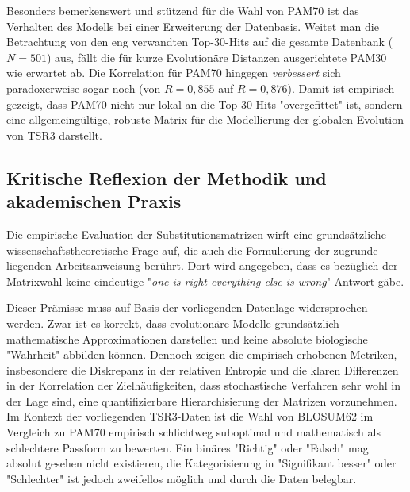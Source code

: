 \documentclass[11pt, a4paper]{article}
\begin{document}
Besonders bemerkenswert und stützend für die Wahl von PAM70 ist das Verhalten des Modells bei einer Erweiterung der Datenbasis. Weitet man die Betrachtung von den eng verwandten Top-30-Hits auf die gesamte Datenbank ($N=501$) aus, fällt die für kurze Evolutionäre Distanzen ausgerichtete PAM30 wie erwartet ab. Die Korrelation für PAM70 hingegen \textit{verbessert} sich paradoxerweise sogar noch (von $R=0{,}855$ auf $R=0{,}876$). Damit ist empirisch gezeigt, dass PAM70 nicht nur lokal an die Top-30-Hits "overgefittet" ist, sondern eine allgemeingültige, robuste Matrix für die Modellierung der globalen Evolution von TSR3 darstellt.


\subsection{Kritische Reflexion der Methodik und akademischen Praxis}
Die empirische Evaluation der Substitutionsmatrizen wirft eine grundsätzliche wissenschaftstheoretische Frage auf, die auch die Formulierung der zugrunde liegenden Arbeitsanweisung berührt. Dort wird angegeben, dass es bezüglich der Matrixwahl keine eindeutige "\textit{one is right everything else is wrong}"-Antwort gäbe. 

Dieser Prämisse muss auf Basis der vorliegenden Datenlage widersprochen werden. Zwar ist es korrekt, dass evolutionäre Modelle grundsätzlich mathematische Approximationen darstellen und keine absolute biologische "Wahrheit" abbilden können. Dennoch zeigen die empirisch erhobenen Metriken, insbesondere die Diskrepanz in der relativen Entropie und die klaren Differenzen in der Korrelation der Zielhäufigkeiten, dass stochastische Verfahren sehr wohl in der Lage sind, eine quantifizierbare Hierarchisierung der Matrizen vorzunehmen. Im Kontext der vorliegenden TSR3-Daten ist die Wahl von BLOSUM62 im Vergleich zu PAM70 empirisch schlichtweg suboptimal und mathematisch als schlechtere Passform zu bewerten. Ein binäres "Richtig" oder "Falsch" mag absolut gesehen nicht existieren, die Kategorisierung in "Signifikant besser" oder "Schlechter" ist jedoch zweifellos möglich und durch die Daten belegbar.
\end{document}
